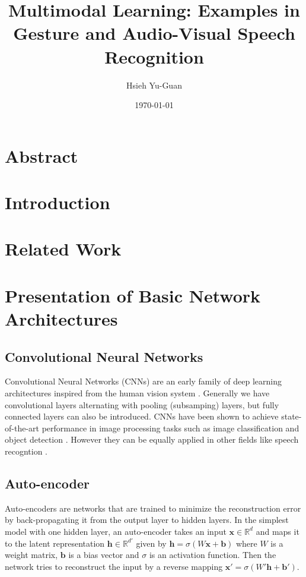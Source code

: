 

\title{Multimodal Learning: Examples in Gesture and Audio-Visual
Speech Recognition\vspace{-0.5em}}
\author{Hsieh Yu-Guan}
\date{\today}
\maketitle

\section*{Abstract}

\section{Introduction}

\section{Related Work}

\section{Presentation of Basic Network Architectures}

\subsection{Convolutional Neural Networks}

Convolutional Neural Networks (CNNs) are an early family of deep learning
architectures inspired from the human vision system \cite{Y. LeCun 1998}.
Generally we have convolutional layers alternating with pooling
(subsamping) layers, but fully connected layers can also be introduced.
CNNs have been shown to achieve state-of-the-art performance in
image processing tasks such as image classification
\cite{A. Krizhevsky 2012} and object detection \cite{Y. LeCun 2010}.
However they can be equally applied in other fields like speech recogntion
\cite{L. Deng 2013}.

\subsection{Auto-encoder}

Auto-encoders are networks that are trained to minimize the reconstruction
error by back-propagating it from the output layer to hidden layers.
In the simplest model with one hidden layer, an auto-encoder takes an
input $\mathbf{x} \in \mathbb{R}^d$ and maps it to the latent
representation $\mathbf{h} \in \mathbb{R}^{d'}$ given by
$\mathbf{h} = \sigma(W\mathbf{x}+\mathbf{b})$ where $W$
is a weight matrix, $\mathbf{b}$ is a bias vector and $\sigma$ is an
activation function. Then the network tries to reconstruct the input
by a reverse mapping $\mathbf{x'} = \sigma(W'\mathbf{h}+\mathbf{b'})$.

